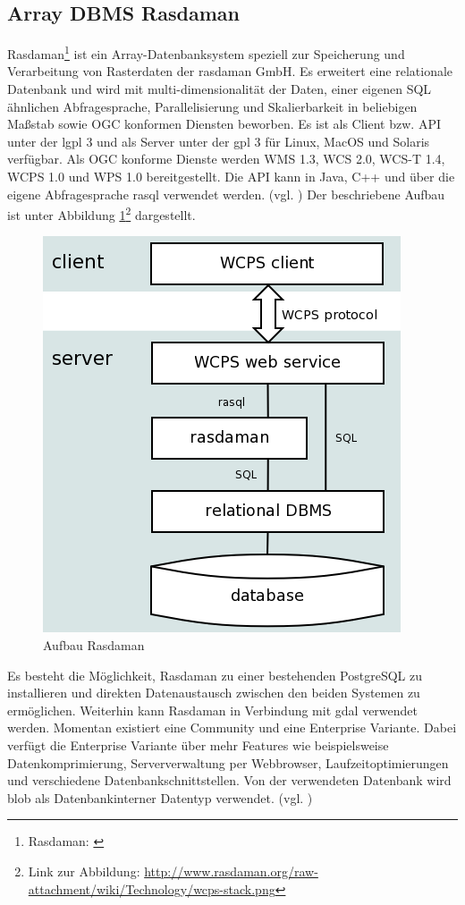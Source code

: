 \subsection{Array DBMS Rasdaman}
Rasdaman\footnote{Rasdaman: \cite{website:rasdaman.org}} ist ein Array-Datenbanksystem speziell zur Speicherung und Verarbeitung von Rasterdaten der rasdaman GmbH.
Es erweitert eine relationale Datenbank und wird mit  multi-dimensionalität der Daten, einer eigenen SQL ähnlichen Abfragesprache, Parallelisierung und Skalierbarkeit in beliebigen Maßstab sowie OGC konformen Diensten beworben.
Es ist als Client bzw. API unter der \Gls{lgpl} 3 und als Server unter der \Gls{gpl} 3 für Linux, MacOS und Solaris verfügbar.
Als OGC konforme Dienste werden WMS 1.3, WCS 2.0, WCS-T 1.4, WCPS 1.0 und WPS 1.0 bereitgestellt.
Die API kann in Java, C++ und über die eigene Abfragesprache rasql verwendet werden. (vgl. \cite{website:rasdamanogeo})
Der beschriebene Aufbau ist unter Abbildung \ref{fig:rasdaman}\footnote{Link zur Abbildung: \url{http://www.rasdaman.org/raw-attachment/wiki/Technology/wcps-stack.png}} dargestellt.
\begin{figure}[h!]
\centering
\includegraphics[width=.4\textwidth]{Abbildungen/rasdaman-aufbau.png}
\caption[Aufbau Rasdaman]{Aufbau Rasdaman}
\label{fig:rasdaman}
\end{figure}

Es besteht die Möglichkeit, Rasdaman zu einer bestehenden PostgreSQL zu installieren und direkten Datenaustausch zwischen den beiden Systemen zu ermöglichen.
Weiterhin kann Rasdaman in Verbindung mit \Gls{gdal} verwendet werden.
Momentan existiert eine Community und eine Enterprise Variante. Dabei verfügt die Enterprise Variante über mehr Features wie beispielsweise Datenkomprimierung, Serververwaltung per Webbrowser, Laufzeitoptimierungen und verschiedene Datenbankschnittstellen.
Von der verwendeten Datenbank wird \Gls{blob} als Datenbankinterner Datentyp verwendet. (vgl. \cite{website:rasdamanowiki})